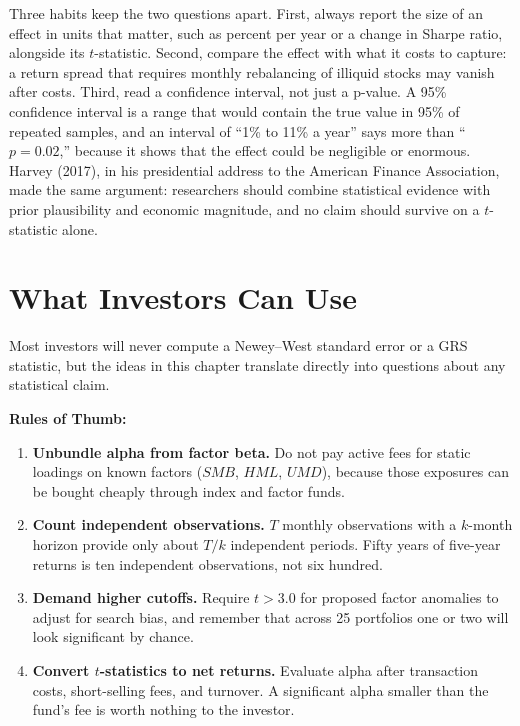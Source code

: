 Three habits keep the two questions apart. First, always report the size of an effect in units that matter, such as percent per year or a change in Sharpe ratio, alongside its $t$-statistic. Second, compare the effect with what it costs to capture: a return spread that requires monthly rebalancing of illiquid stocks may vanish after costs. Third, read a confidence interval, not just a p-value. A 95\% confidence interval is a range that would contain the true value in 95\% of repeated samples, and an interval of ``1\% to 11\% a year'' says more than ``$p = 0.02$,'' because it shows that the effect could be negligible or enormous. Harvey (2017), in his presidential address to the American Finance Association, made the same argument: researchers should combine statistical evidence with prior plausibility and economic magnitude, and no claim should survive on a $t$-statistic alone.

\section{What Investors Can Use}
\label{sec:03-investors}

Most investors will never compute a Newey--West standard error or a GRS statistic, but the ideas in this chapter translate directly into questions about any statistical claim.

\textbf{Rules of Thumb:}
\begin{enumerate}
  \item \textbf{Unbundle alpha from factor beta.} Do not pay active fees for static loadings on known factors ($SMB$, $HML$, $UMD$), because those exposures can be bought cheaply through index and factor funds.
  \item \textbf{Count independent observations.} $T$ monthly observations with a $k$-month horizon provide only about $T/k$ independent periods. Fifty years of five-year returns is ten independent observations, not six hundred.
  \item \textbf{Demand higher cutoffs.} Require $t > 3.0$ for proposed factor anomalies to adjust for search bias, and remember that across 25 portfolios one or two will look significant by chance.
  \item \textbf{Convert $t$-statistics to net returns.} Evaluate alpha after transaction costs, short-selling fees, and turnover. A significant alpha smaller than the fund's fee is worth nothing to the investor.
\end{enumerate}

